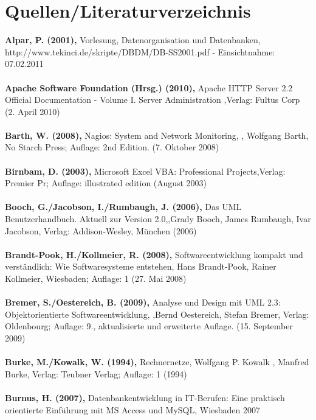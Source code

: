 \chapter*{Quellen/Literaturverzeichnis}



\textbf{Alpar, P. (2001),} Vorlesung, Datenorganisation und Datenbanken, http://www.tekinci.de/skripte/DBDM/DB-SS2001.pdf - Einsichtnahme: 07.02.2011\\\\
\textbf{Apache Software Foundation (Hrsg.) (2010),} Apache HTTP Server 2.2 Official Documentation - Volume I. Server Administration ,Verlag: Fultus Corp (2. April 2010)\\\\
\textbf{Barth, W. (2008),} Nagios: System and Network Monitoring, , Wolfgang Barth, No Starch Press; Auflage: 2nd Edition. (7. Oktober 2008)\\\\
\textbf{Birnbam, D. (2003),} Microsoft Excel VBA: Professional Projects,Verlag: Premier Pr; Auflage: illustrated edition (August 2003)\\\\
\textbf{Booch, G./Jacobson, I./Rumbaugh, J. (2006),} Das UML Benutzerhandbuch. Aktuell zur Version 2.0,,Grady Booch, James Rumbaugh, Ivar Jacobson, Verlag: Addison-Wesley, München (2006)\\\\
\textbf{Brandt-Pook, H./Kollmeier, R. (2008),} Softwareentwicklung kompakt und verständlich: Wie Softwaresysteme entstehen, Hans Brandt-Pook, Rainer Kollmeier, Wiesbaden; Auflage: 1 (27. Mai 2008)\\\\
\textbf{Bremer, S./Oestereich, B. (2009),} Analyse und Design mit UML 2.3: Objektorientierte Softwareentwicklung, ,Bernd Oestereich, Stefan Bremer, Verlag: Oldenbourg; Auflage: 9., aktualisierte und erweiterte Auflage. (15. September 2009)\\\\
\textbf{Burke, M./Kowalk, W. (1994),} Rechnernetze, Wolfgang P. Kowalk , Manfred Burke, Verlag: Teubner Verlag; Auflage: 1 (1994)\\\\
\textbf{Burnus, H. (2007),} Datenbankentwicklung in IT-Berufen: Eine praktisch orientierte Einführung mit MS Access und MySQL, Wiesbaden 2007\\\\
